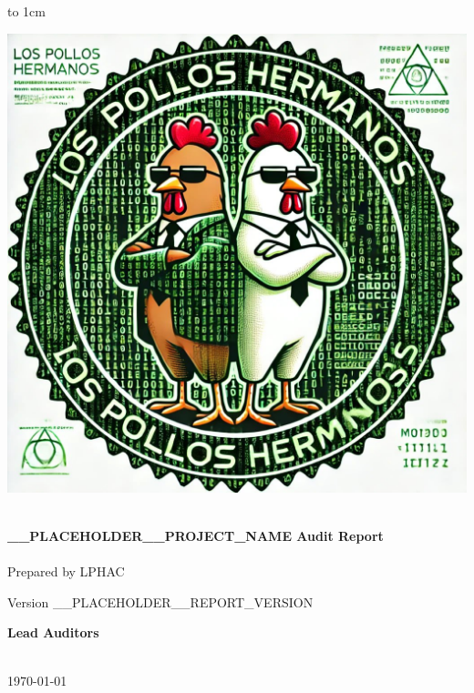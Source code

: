\newlength{\logoWidth}
\setlength{\logoWidth}{0.5\textwidth}

\begin{titlepage}
  \normalsize %
  \vbox to 1cm{\vfill}

  \begin{center}    
    \includegraphics[width=\logoWidth]{img/LPHAC-logo.jpg} %
    
    \vspace{1cm}

    \noindent\makebox[\linewidth]{\rule{.75\paperwidth}{.6pt}}\\[0.7cm]

    {\huge \bfseries
      __PLACEHOLDER__PROJECT_NAME Audit Report
    }\\[0.25cm]
    
    \noindent\makebox[\linewidth]{\rule{.75\paperwidth}{.6pt}}\\[0.7cm]

    \large
    Prepared by LPHAC

    \large{
      Version __PLACEHOLDER__REPORT_VERSION
    }\\[1.2cm]
    
    \vfill

    \large
    {\bfseries Lead Auditors}\\

    \vspace{0.2cm}
    \\
    \vspace{1cm}

    \bigbreak
    \vfill
    
    {\normalsize \today}

  \end{center}

\end{titlepage}
